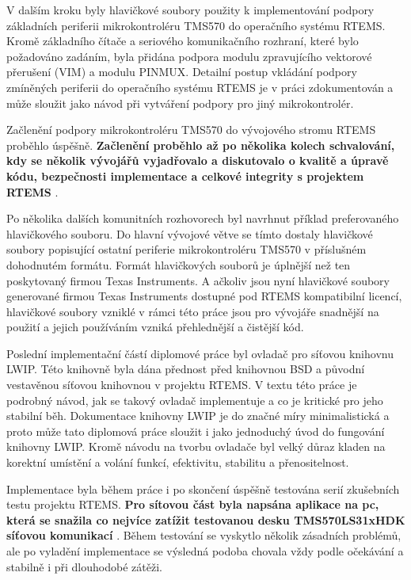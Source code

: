 V dalším kroku byly hlavičkové soubory použity k implementování podpory základních periferii mikrokontroléru TMS570 do operačního systému RTEMS.
Kromě základního čítače a seriového komunikačního rozhraní, které bylo požadováno zadáním, byla přidána podpora modulu zpravujícího vektorové přerušení (VIM) a modulu PINMUX.
Detailní postup vkládání podpory zmíněných periferii do operačního systému RTEMS je v práci zdokumentován a může sloužit jako návod při vytváření podpory pro jiný mikrokontrolér.

Začlenění podpory mikrokontroléru TMS570 do vývojového stromu RTEMS proběhlo úspěšně.
{\bf Začlenění proběhlo až po několika kolech schvalování, kdy se několik vývojářů vyjadřovalo a diskutovalo o kvalitě a úpravě kódu, bezpečnosti implementace a celkové integrity s projektem RTEMS }.

Po několika dalších komunitních rozhovorech byl navrhnut příklad preferovaného hlavičkového souboru.
Do hlavní vývojové větve se tímto dostaly hlavičkové soubory popisující ostatní periferie mikrokontroléru TMS570 v příslušném dohodnutém formátu.
Formát hlavičkových souborů je úplnější než ten poskytovaný firmou Texas Instruments.
A ačkoliv jsou nyní hlavičkové soubory generované firmou Texas Instruments dostupné pod RTEMS kompatibilní licencí, hlavičkové soubory vzniklé v rámci této práce jsou pro vývojáře snadnější na použití a jejich používáním vzniká přehlednější a čistější kód. 

Poslední implementační částí diplomové práce byl ovladač pro síťovou knihovnu LWIP.
Této knihovně byla dána přednost před knihovnou BSD a původní vestavěnou síťovou knihovnou v projektu RTEMS.
V textu této práce je podrobný návod, jak se takový ovladač implementuje a co je kritické pro jeho stabilní běh.
Dokumentace knihovny LWIP je do značné míry minimalistická a proto může tato diplomová práce sloužit i jako jednoduchý úvod do fungování knihovny LWIP.
Kromě návodu na tvorbu ovladače byl velký důraz kladen na korektní umístění a volání funkcí, efektivitu, stabilitu a přenositelnost.

Implementace byla během práce i po skončení úspěšně testována serií zkušebních testu projektu RTEMS.
{\bf Pro sítovou část byla napsána aplikace na pc, která se snažila co nejvíce zatížit testovanou desku TMS570LS31xHDK síťovou komunikací }.
Během testování se vyskytlo několik zásadních problémů, ale po vyladění implementace se výsledná podoba chovala vždy podle očekávání a stabilně i při dlouhodobé zátěži.




\bye
\grid
